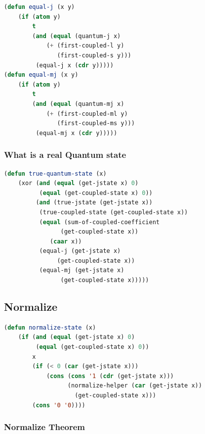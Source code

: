 \documentclass[
paper=128mm:96mm, %
fontsize=11pt, %
pagesize, %
parskip=half-, %
]{scrartcl} %
\theoremstyle{mythmstyle} %
\begin{document}
\clearpage

\begin{lstlisting}[language=Lisp,breaklines=true]
(defun equal-j (x y)
	(if (atom y)
	    t
	    (and (equal (quantum-j x)
			(+ (first-coupled-l y)
			   (first-coupled-s y)))
		 (equal-j x (cdr y)))))
(defun equal-mj (x y)
	(if (atom y)
	    t
	    (and (equal (quantum-mj x)
			(+ (first-coupled-ml y)
			   (first-coupled-ms y)))
		 (equal-mj x (cdr y)))))
\end{lstlisting}

\clearpage

\subsubsection{What is a real Quantum state}

\begin{lstlisting}[language=Lisp,breaklines=true]
(defun true-quantum-state (x)
	(xor (and (equal (get-jstate x) 0)
		  (equal (get-coupled-state x) 0))
	     (and (true-jstate (get-jstate x))
		  (true-coupled-state (get-coupled-state x))
		  (equal (sum-of-coupled-coefficient 
				(get-coupled-state x))
			 (caar x))
		  (equal-j (get-jstate x) 
			   (get-coupled-state x))
		  (equal-mj (get-jstate x)
			    (get-coupled-state x)))))
\end{lstlisting}

\clearpage

\subsection{Normalize}

\begin{lstlisting}[language=Lisp,breaklines=true]
(defun normalize-state (x)
	(if (and (equal (get-jstate x) 0)
		 (equal (get-coupled-state x) 0))
	    x
	    (if (< 0 (car (get-jstate x)))
	        (cons (cons '1 (cdr (get-jstate x)))
		          (normalize-helper (car (get-jstate x)) 
					(get-coupled-state x)))
		(cons '0 '0))))	
\end{lstlisting}


\clearpage

\subsubsection{Normalize Theorem}
\end{document}
